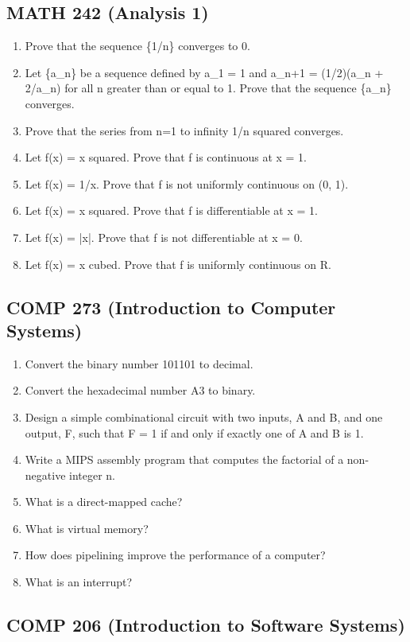 \documentclass{article}
\begin{document}
\subsection*{MATH 242 (Analysis 1)}

\begin{enumerate}
\item Prove that the sequence \{1/n\} converges to 0.
\item Let \{a\_n\} be a sequence defined by a\_1 = 1 and a\_{n+1} = (1/2)(a\_n + 2/a\_n) for all n greater than or equal to 1. Prove that the sequence \{a\_n\} converges.
\item Prove that the series from n=1 to infinity 1/n squared converges.
\item Let f(x) = x squared. Prove that f is continuous at x = 1.
\item Let f(x) = 1/x. Prove that f is not uniformly continuous on (0, 1).
\item Let f(x) = x squared. Prove that f is differentiable at x = 1.
\item Let f(x) = |x|. Prove that f is not differentiable at x = 0.
\item Let f(x) = x cubed. Prove that f is uniformly continuous on R.
\end{enumerate}

\subsection*{COMP 273 (Introduction to Computer Systems)}

\begin{enumerate}
\item Convert the binary number 101101 to decimal.
\item Convert the hexadecimal number A3 to binary.
\item Design a simple combinational circuit with two inputs, A and B, and one output, F, such that F = 1 if and only if exactly one of A and B is 1.
\item Write a MIPS assembly program that computes the factorial of a non-negative integer n.
\item What is a direct-mapped cache?
\item What is virtual memory?
\item How does pipelining improve the performance of a computer?
\item What is an interrupt?
\end{enumerate}

\subsection*{COMP 206 (Introduction to Software Systems)}
\end{document}
